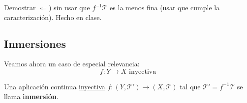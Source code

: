 \begin{enun}
Demostrar $\Leftarrow$) sin usar que $f^{-1}\mathcal{T}$ es la menos fina (usar que cumple la caracterización). Hecho en clase.
\end{enun}

\subsection{Inmersiones}
\label{sub:inmersiones}
Veamos ahora un caso de especial relevancia:
\[
\boxed{f: Y \rightarrow X \text{ inyectiva}} 
\]
\begin{defi}
Una aplicación continua \underline{inyectiva} $f: \left( Y, \mathcal{T}' \right) \rightarrow \left( X, \mathcal{T} \right)$ tal que $\mathcal{T}' = f^{-1} \mathcal{T}$ se llama \textbf{inmersión}.
\end{defi}


